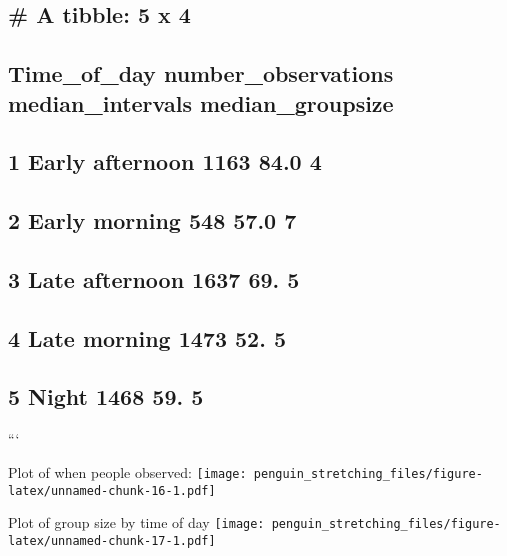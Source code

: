 \documentclass[]{article}
\begin{document}
\begin{verbatim}
\end{verbatim}

\hypertarget{a-tibble-5-x-4}{%
\subsection{\# A tibble: 5 x 4}\label{a-tibble-5-x-4}}

\hypertarget{time_of_day-number_observations-median_intervals-median_groupsize}{%
\subsection{Time\_of\_day number\_observations median\_intervals
median\_groupsize}\label{time_of_day-number_observations-median_intervals-median_groupsize}}

\hypertarget{section-4}{%
\subsection{\texorpdfstring{ }{   }}\label{section-4}}

\hypertarget{early-afternoon-1163-84.0-4}{%
\subsection{1 Early afternoon 1163 84.0
4}\label{early-afternoon-1163-84.0-4}}

\hypertarget{early-morning-548-57.0-7}{%
\subsection{2 Early morning 548 57.0 7}\label{early-morning-548-57.0-7}}

\hypertarget{late-afternoon-1637-69.-5}{%
\subsection{3 Late afternoon 1637 69.
5}\label{late-afternoon-1637-69.-5}}

\hypertarget{late-morning-1473-52.-5}{%
\subsection{4 Late morning 1473 52. 5}\label{late-morning-1473-52.-5}}

\hypertarget{night-1468-59.-5}{%
\subsection{5 Night 1468 59. 5}\label{night-1468-59.-5}}

```

Plot of when people observed:
\texttt{[image: penguin\_stretching\_files/figure-latex/unnamed-chunk-16-1.pdf]}

Plot of group size by time of day
\texttt{[image: penguin\_stretching\_files/figure-latex/unnamed-chunk-17-1.pdf]}
\end{document}
